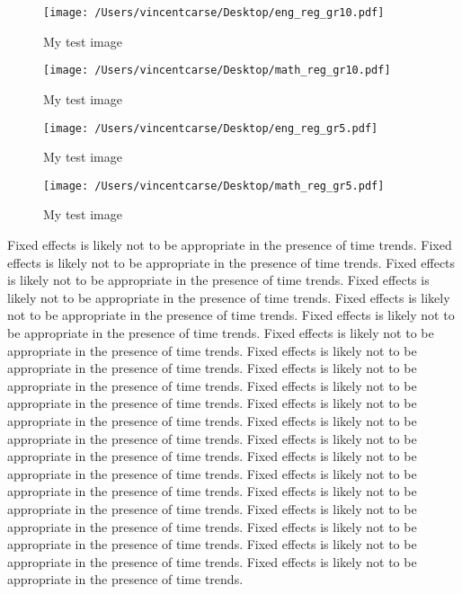 \documentclass[11pt]{article}
\begin{document}
\begin{figure}
\label{image-myimage}
\texttt{[image: /Users/vincentcarse/Desktop/eng\_reg\_gr10.pdf]}
\caption{My test image}
\end{figure}



\begin{figure}
\label{image-myimage}
\texttt{[image: /Users/vincentcarse/Desktop/math\_reg\_gr10.pdf]}
\caption{My test image}
\end{figure}

\begin{figure}
\label{image-myimage}
\texttt{[image: /Users/vincentcarse/Desktop/eng\_reg\_gr5.pdf]}
\caption{My test image}
\end{figure}

\begin{figure}
\label{image-myimage}
\texttt{[image: /Users/vincentcarse/Desktop/math\_reg\_gr5.pdf]}
\caption{My test image}
\end{figure}

\FloatBarrier

Fixed effects is likely not to be appropriate in the presence of time trends. 
Fixed effects is likely not to be appropriate in the presence of time trends. 
Fixed effects is likely not to be appropriate in the presence of time trends. 
Fixed effects is likely not to be appropriate in the presence of time trends. 
Fixed effects is likely not to be appropriate in the presence of time trends. 
Fixed effects is likely not to be appropriate in the presence of time trends. 
Fixed effects is likely not to be appropriate in the presence of time trends. 
Fixed effects is likely not to be appropriate in the presence of time trends. 
Fixed effects is likely not to be appropriate in the presence of time trends. 
Fixed effects is likely not to be appropriate in the presence of time trends. 
Fixed effects is likely not to be appropriate in the presence of time trends. 
Fixed effects is likely not to be appropriate in the presence of time trends. 
Fixed effects is likely not to be appropriate in the presence of time trends. 
Fixed effects is likely not to be appropriate in the presence of time trends. 
Fixed effects is likely not to be appropriate in the presence of time trends. 
Fixed effects is likely not to be appropriate in the presence of time trends. 
Fixed effects is likely not to be appropriate in the presence of time trends. 
Fixed effects is likely not to be appropriate in the presence of time trends. 
Fixed effects is likely not to be appropriate in the presence of time trends. 
Fixed effects is likely not to be appropriate in the presence of time trends. 
\end{document}
